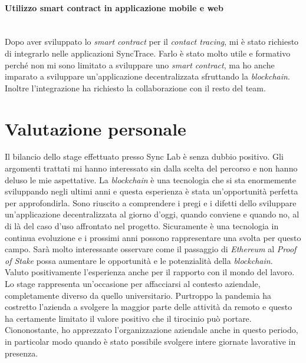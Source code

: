 \paragraph{Utilizzo smart contract in applicazione mobile e web}\mbox{}\\
Dopo aver sviluppato lo \textit{smart contract} per il \textit{contact tracing}, mi è stato richiesto di integrarlo nelle applicazioni SyncTrace. Farlo è stato molto utile e formativo perché non mi sono limitato a sviluppare uno \textit{smart contract}, ma ho anche imparato a sviluppare un'applicazione decentralizzata sfruttando la \textit{blockchain}. Inoltre l'integrazione ha richiesto la collaborazione con il resto del team. 

\section{Valutazione personale}
Il bilancio dello stage effettuato presso Sync Lab è senza dubbio positivo. Gli argomenti trattati mi hanno interessato sin dalla scelta del percorso e non hanno deluso le mie aspettative. La \textit{blockchain} è una tecnologia che si sta enormemente sviluppando negli ultimi anni e questa esperienza è stata un'opportunità perfetta per approfondirla. Sono riuscito a comprendere i pregi e i difetti dello sviluppare un'applicazione decentralizzata al giorno d'oggi, quando conviene e quando no, al di là del caso d'uso affrontato nel progetto. Sicuramente è una tecnologia in continua evoluzione e i prossimi anni possono rappresentare una svolta per questo campo. Sarà molto interessante osservare come il passaggio di \textit{Ethereum} al \textit{Proof of Stake} possa aumentare le opportunità e le potenzialità della \textit{blockchain}.\\ 
Valuto positivamente l'esperienza anche per il rapporto con il mondo del lavoro. Lo stage rappresenta un'occasione per affacciarsi al contesto aziendale, completamente diverso da quello universitario. Purtroppo la pandemia ha costretto l'azienda a svolgere la maggior parte delle attività da remoto e questo ha certamente limitato il valore positivo che il tirocinio può portare. Ciononostante, ho apprezzato l'organizzazione aziendale anche in questo periodo, in particolar modo quando è stato possibile svolgere intere giornate lavorative in presenza.
 


